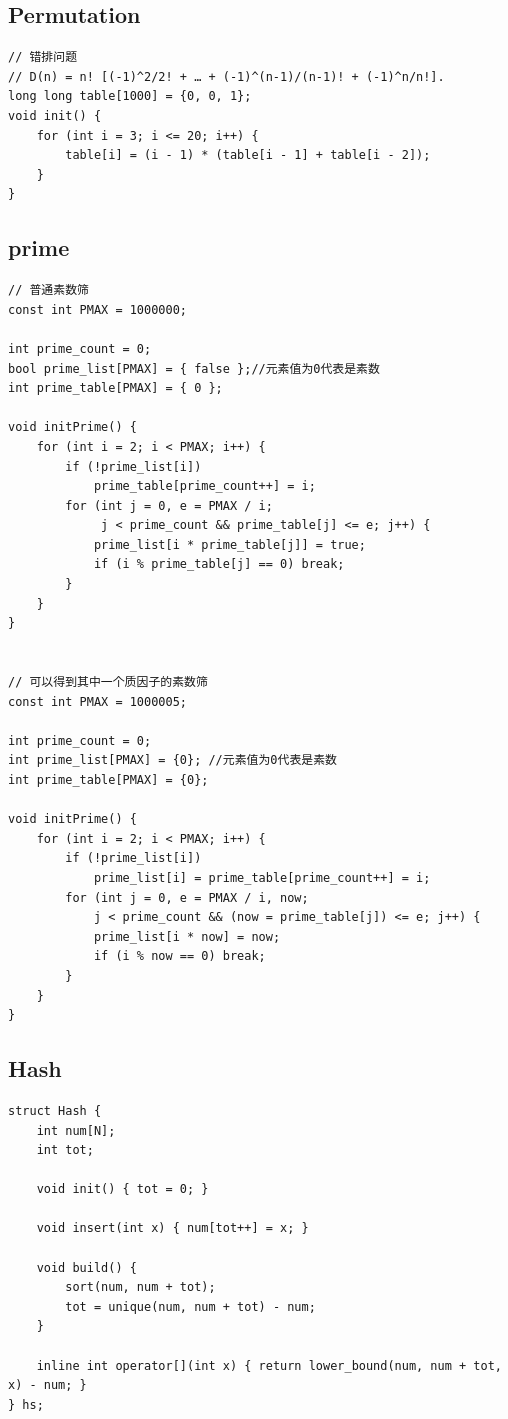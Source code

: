 \documentclass[twoside]{article}
\begin{document}
\subsection{Permutation}
\begin{lstlisting}
// 错排问题
// D(n) = n! [(-1)^2/2! + … + (-1)^(n-1)/(n-1)! + (-1)^n/n!].
long long table[1000] = {0, 0, 1};
void init() {
    for (int i = 3; i <= 20; i++) {
        table[i] = (i - 1) * (table[i - 1] + table[i - 2]);
    }
}\end{lstlisting}
\subsection{prime}
\begin{lstlisting}
// 普通素数筛
const int PMAX = 1000000;

int prime_count = 0;
bool prime_list[PMAX] = { false };//元素值为0代表是素数
int prime_table[PMAX] = { 0 };

void initPrime() {
    for (int i = 2; i < PMAX; i++) {
        if (!prime_list[i])
            prime_table[prime_count++] = i;
        for (int j = 0, e = PMAX / i;
             j < prime_count && prime_table[j] <= e; j++) {
            prime_list[i * prime_table[j]] = true;
            if (i % prime_table[j] == 0) break;
        }
    }
}


// 可以得到其中一个质因子的素数筛
const int PMAX = 1000005;

int prime_count = 0;
int prime_list[PMAX] = {0}; //元素值为0代表是素数
int prime_table[PMAX] = {0};

void initPrime() {
    for (int i = 2; i < PMAX; i++) {
        if (!prime_list[i])
            prime_list[i] = prime_table[prime_count++] = i;
        for (int j = 0, e = PMAX / i, now; 
        	j < prime_count && (now = prime_table[j]) <= e; j++) {
            prime_list[i * now] = now;
            if (i % now == 0) break;
        }
    }
}\end{lstlisting}
\subsection{Hash}
\begin{lstlisting}
struct Hash {
    int num[N];
    int tot;

    void init() { tot = 0; }

    void insert(int x) { num[tot++] = x; }

    void build() {
        sort(num, num + tot);
        tot = unique(num, num + tot) - num;
    }

    inline int operator[](int x) { return lower_bound(num, num + tot, x) - num; }
} hs;\end{lstlisting}
\end{document}
